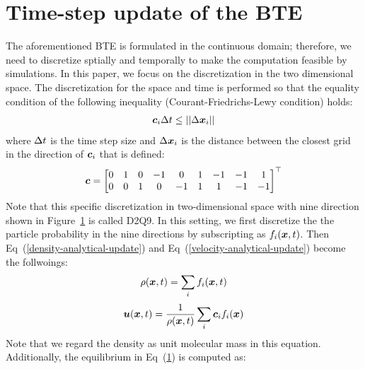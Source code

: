 \section{Time-step update of the BTE}
The aforementioned BTE is formulated in the 
continuous domain; therefore,
we need to discretize sptially and 
temporally to make the computation 
feasible by simulations.
In this paper, we focus on the discretization
in the two dimensional space.
The discretization for the space and time
is performed so that the equality condition of 
the following inequality
(Courant-Friedrichs-Lewy condition) holds:
\begin{equation}
\begin{aligned}
  \boldsymbol{c}_i \Delta t \leq || \Delta \boldsymbol{x}_i ||
\end{aligned}
\end{equation}
where $\Delta t$ is the time step size 
and $\Delta \boldsymbol{x}_i$ is the distance between 
the closest grid in the direction
of $\boldsymbol{c}_i$ that is defined:
\begin{equation}
\begin{aligned}
  \boldsymbol{c} = \begin{bmatrix}
    0 & 1 & 0 & -1 & 0 & 1 & -1 & -1 & 1 \\
    0 & 0 & 1 & 0 & -1 & 1 & 1 & -1 & -1 \\
  \end{bmatrix}^\top
\end{aligned}
\end{equation}
Note that this specific discretization in two-dimensional
space with nine direction shown in 
Figure~\ref{} is called D2Q9.
In this setting, 
we first discretize the
the particle probability
in the nine directions by subscripting 
as $f_i(\boldsymbol{x}, t)$.
Then Eq~(\ref{density-analytical-update})
and Eq~(\ref{velocity-analytical-update})
become the follwoings:
\begin{equation}
  \begin{aligned}
    \rho(\boldsymbol{x}, t) &= \sum_i f_i(\boldsymbol{x}, t) \\
  \end{aligned}
\end{equation}
\begin{equation}
\begin{aligned}
  \boldsymbol{u}(\boldsymbol{x}, t) &= 
  \frac{1}{\rho(\boldsymbol{x}, t)} \sum_i \boldsymbol{c}_i f_i(\boldsymbol{x}) \\
\end{aligned}
\end{equation}
Note that we regard the density as
unit molecular mass in this equation.
Additionally, the equilibrium in Eq~(\ref{}) is computed as:
